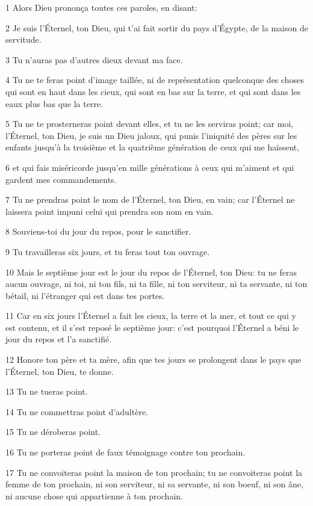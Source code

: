 \par 1 Alors Dieu prononça toutes ces paroles, en disant:
\par 2 Je suis l'Éternel, ton Dieu, qui t'ai fait sortir du pays d'Égypte, de la maison de servitude.
\par 3 Tu n'auras pas d'autres dieux devant ma face.
\par 4 Tu ne te feras point d'image taillée, ni de représentation quelconque des choses qui sont en haut dans les cieux, qui sont en bas sur la terre, et qui sont dans les eaux plus bas que la terre.
\par 5 Tu ne te prosterneras point devant elles, et tu ne les serviras point; car moi, l'Éternel, ton Dieu, je suis un Dieu jaloux, qui punis l'iniquité des pères sur les enfants jusqu'à la troisième et la quatrième génération de ceux qui me haïssent,
\par 6 et qui fais miséricorde jusqu'en mille générations à ceux qui m'aiment et qui gardent mes commandements.
\par 7 Tu ne prendras point le nom de l'Éternel, ton Dieu, en vain; car l'Éternel ne laissera point impuni celui qui prendra son nom en vain.
\par 8 Souviens-toi du jour du repos, pour le sanctifier.
\par 9 Tu travailleras six jours, et tu feras tout ton ouvrage.
\par 10 Mais le septième jour est le jour du repos de l'Éternel, ton Dieu: tu ne feras aucun ouvrage, ni toi, ni ton fils, ni ta fille, ni ton serviteur, ni ta servante, ni ton bétail, ni l'étranger qui est dans tes portes.
\par 11 Car en six jours l'Éternel a fait les cieux, la terre et la mer, et tout ce qui y est contenu, et il s'est reposé le septième jour: c'est pourquoi l'Éternel a béni le jour du repos et l'a sanctifié.
\par 12 Honore ton père et ta mère, afin que tes jours se prolongent dans le pays que l'Éternel, ton Dieu, te donne.
\par 13 Tu ne tueras point.
\par 14 Tu ne commettras point d'adultère.
\par 15 Tu ne déroberas point.
\par 16 Tu ne porteras point de faux témoignage contre ton prochain.
\par 17 Tu ne convoiteras point la maison de ton prochain; tu ne convoiteras point la femme de ton prochain, ni son serviteur, ni sa servante, ni son boeuf, ni son âne, ni aucune chose qui appartienne à ton prochain.
